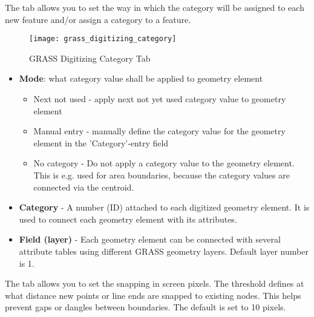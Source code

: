 The  tab allows you to set the way in which the category will
be assigned to each new feature and/or assign a category to a feature.

\begin{figure}[h]
 \begin{center}
  \caption{GRASS Digitizing Category Tab \nixcaption}\label{fig:grass_digitizing_category}
  \texttt{[image: grass\_digitizing\_category]}
 \end{center}
\end{figure}

\begin{itemize}
\item \textbf{Mode}: what category value shall be applied to geometry element
\begin{itemize}
\item Next not used - apply next not yet used category value to geometry
element
\item Manual entry - manually define the category value for the geometry
element in the 'Category'-entry field
\item No category - Do not apply a category value to the geometry element.
This is e.g. used for area boundaries, because the category values are
connected via the centroid.
\end{itemize}
\item \textbf{Category} - A number (ID) attached to each digitized geometry
element. It is used to connect each geometry element with its attributes.
\item \textbf{Field (layer)} - Each geometry element can be connected with
several attribute tables using different GRASS geometry layers. Default layer
number is 1. 
\end{itemize}

\begin{Tip}\caption{\textsc{Creating an additional GRASS 'layer' with QGIS}}
\end{Tip}

\label{label_settingtab}

The  tab allows you to set the snapping in screen pixels. The
threshold defines at what distance new points or line ends are snapped to
existing nodes. This helps prevent gaps or dangles between boundaries. The
default is set to 10 pixels.

